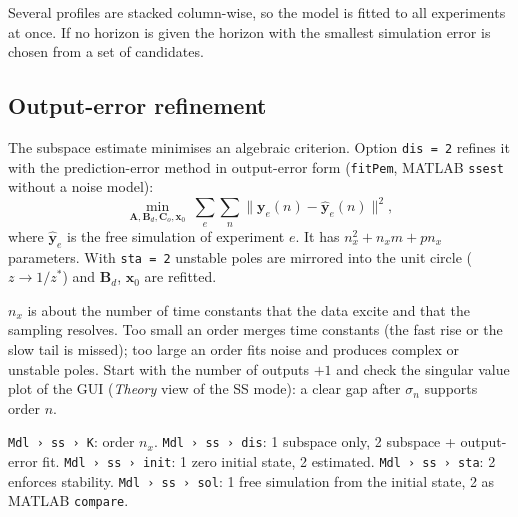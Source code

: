 \documentclass[11pt,a4paper]{article}
\newcommand{\mat}[1]{\bm{#1}}
\newcommand{\cfg}[1]{\texttt{#1}}
\begin{document}
Several profiles are stacked column-wise, so the model is fitted to all experiments at once. If no horizon is given
the horizon with the smallest simulation error is chosen from a set of candidates.

\subsection{Output-error refinement}
The subspace estimate minimises an algebraic criterion. Option \cfg{dis = 2} refines it with the prediction-error
method in output-error form \cite{ljung} (\texttt{fitPem}, MATLAB \texttt{ssest} without a noise model):
\begin{equation}
  \min_{\mat A,\mat B_d,\mat C_o,\bm x_0}\ \sum_{e}\sum_{n}\bigl\lVert \bm y_e(n) - \hat{\bm y}_e(n)\bigr\rVert^2 ,
\end{equation}
where $\hat{\bm y}_e$ is the free simulation of experiment $e$. It has $n_x^2+n_xm+pn_x$ parameters. With
\cfg{sta = 2} unstable poles are mirrored into the unit circle ($z\to1/z^*$) and $\mat B_d$, $\bm x_0$ are refitted.

\begin{keybox}
$n_x$ is about the number of time constants that the data excite and that the sampling resolves. Too small an order
merges time constants (the fast rise or the slow tail is missed); too large an order fits noise and produces complex
or unstable poles. Start with the number of outputs $+1$ and check the singular value plot of the GUI (\emph{Theory}
view of the SS mode): a clear gap after $\sigma_{n}$ supports order $n$.
\end{keybox}

\begin{cfgbox}
\cfg{Mdl › ss › K}: order $n_x$. \cfg{Mdl › ss › dis}: 1 subspace only, 2 subspace + output-error fit.
\cfg{Mdl › ss › init}: 1 zero initial state, 2 estimated. \cfg{Mdl › ss › sta}: 2 enforces stability.
\cfg{Mdl › ss › sol}: 1 free simulation from the initial state, 2 as MATLAB \texttt{compare}.
\end{cfgbox}

\end{document}
